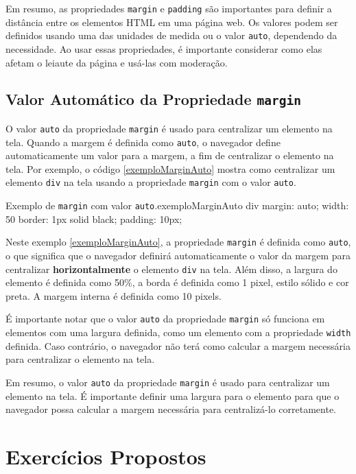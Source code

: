 Em resumo, as propriedades \texttt{margin} e \texttt{padding} são importantes para definir a distância entre os elementos HTML em uma página web. Os valores podem ser definidos usando uma das unidades de medida ou o valor \texttt{auto}, dependendo da necessidade. Ao usar essas propriedades, é importante considerar como elas afetam o leiaute da página e usá-las com moderação.

\subsection{Valor Automático da Propriedade \texttt{margin}}

O valor \texttt{auto} da propriedade \texttt{margin} é usado para centralizar um elemento na tela. Quando a margem é definida como \texttt{auto}, o navegador define automaticamente um valor para a margem, a fim de centralizar o elemento na tela. Por exemplo, o código \ref{exemploMarginAuto} mostra como centralizar um elemento \texttt{div} na tela usando a propriedade \texttt{margin} com o valor \texttt{auto}.

\begin{csscode}{Exemplo de \texttt{margin} com valor \texttt{auto}.}{exemploMarginAuto}
div {
    margin: auto;
    width: 50%
    border: 1px solid black;
    padding: 10px;
}
\end{csscode}

Neste exemplo \ref{exemploMarginAuto}, a propriedade \texttt{margin} é definida como \texttt{auto}, o que significa que o navegador definirá automaticamente o valor da margem para centralizar \textbf{horizontalmente} o elemento \texttt{div} na tela. Além disso, a largura do elemento é definida como 50\%, a borda é definida como 1 pixel, estilo sólido e cor preta. A margem interna é definida como 10 pixels.

É importante notar que o valor \texttt{auto} da propriedade \texttt{margin} só funciona em elementos com uma largura definida, como um elemento com a propriedade \texttt{width} definida. Caso contrário, o navegador não terá como calcular a margem necessária para centralizar o elemento na tela.

Em resumo, o valor \texttt{auto} da propriedade \texttt{margin} é usado para centralizar um elemento na tela. É importante definir uma largura para o elemento para que o navegador possa calcular a margem necessária para centralizá-lo corretamente.

\section{Exercícios Propostos}

